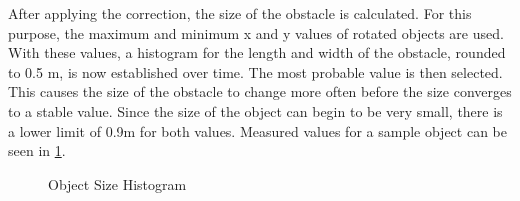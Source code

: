 \documentclass[11pt,oneside,openright]{mpreport}
\begin{document}

After applying the correction, the size of the obstacle is calculated. For this purpose, the maximum and minimum x and y values of
rotated objects are used. With these values, a histogram for the length and width of the obstacle, rounded to 0.5 m, is now established over time. 
The most probable value is then selected. This causes the size of the obstacle to change more often before the size converges to a stable value.
Since the size of the object can begin to be very small, there is a lower limit of 0.9m for both values. Measured values for a sample object can be seen in \cref{obst_hist}.
\begin{figure}[!ht]
\caption{Object Size Histogram}
\label{obst_hist}
\end{figure}

\end{document}
